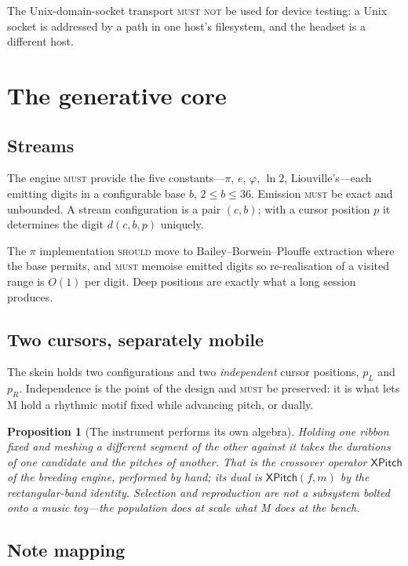 \documentclass[11pt,a4paper]{article}
\newcommand{\MUST}{\textsc{must}}
\newcommand{\MUSTNOT}{\textsc{must not}}
\newcommand{\SHOULD}{\textsc{should}}
\theoremstyle{definition}
\theoremstyle{plain}
\newtheorem{proposition}{Proposition}
\theoremstyle{remark}
\begin{document}
The Unix-domain-socket transport \MUSTNOT{} be used for device testing: a Unix socket is addressed
by a path in one host's filesystem, and the headset is a different host.

\section{The generative core}

\subsection{Streams}

The engine \MUST{} provide the five constants---$\pi$, $e$, $\varphi$, $\ln 2$, Liouville's---each
emitting digits in a configurable base $b$, $2 \le b \le 36$. Emission \MUST{} be exact and
unbounded. A stream configuration is a pair $(c,b)$; with a cursor position $p$ it determines the
digit $d(c,b,p)$ uniquely.

The $\pi$ implementation \SHOULD{} move to Bailey--Borwein--Plouffe extraction where the base
permits, and \MUST{} memoise emitted digits so re-realisation of a visited range is $O(1)$ per
digit. Deep positions are exactly what a long session produces.

\subsection{Two cursors, separately mobile}

The skein holds two configurations and two \emph{independent} cursor positions, $p_L$ and $p_R$.
Independence is the point of the design and \MUST{} be preserved: it is what lets M hold a rhythmic
motif fixed while advancing pitch, or dually.

\begin{proposition}[The instrument performs its own algebra]
Holding one ribbon fixed and meshing a different segment of the other against it takes the
durations of one candidate and the pitches of another. That is the crossover operator
$\mathsf{XPitch}$ of the breeding engine, performed by hand; its dual is
$\mathsf{XPitch}(f,m)$ by the rectangular-band identity. Selection and reproduction are not a
subsystem bolted onto a music toy---the population does at scale what M does at the bench.
\end{proposition}

\subsection{Note mapping}
\end{document}
